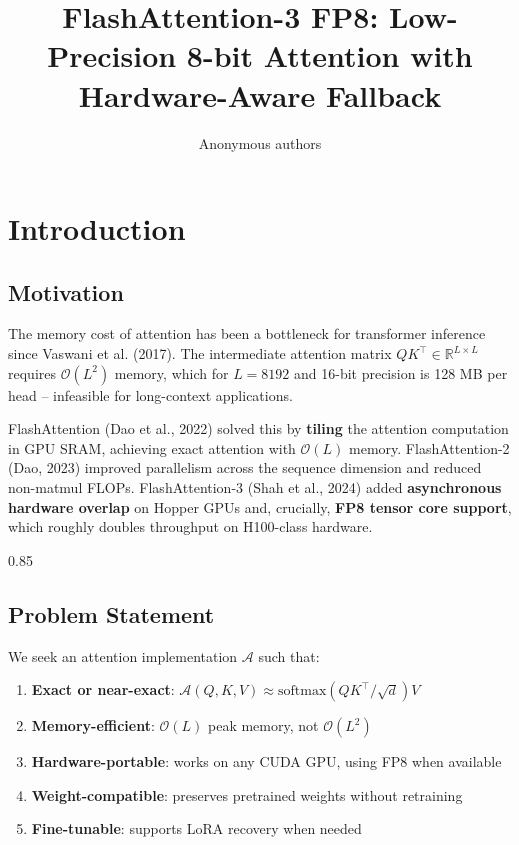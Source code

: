 \title{\textbf{FlashAttention-3 FP8: Low-Precision 8-bit Attention with Hardware-Aware Fallback}}

\author{Anonymous authors}



\section{Introduction}

\subsection{Motivation}

The memory cost of attention has been a bottleneck for transformer inference 
since Vaswani et al. (2017). The intermediate attention matrix $Q K^\top \in 
\mathbb{R}^{L \times L}$ requires $\mathcal{O}(L^2)$ memory, which for 
$L = 8192$ and 16-bit precision is 128 MB per head -- infeasible for 
long-context applications.

FlashAttention (Dao et al., 2022) solved this by \textbf{tiling} the attention 
computation in GPU SRAM, achieving exact attention with $\mathcal{O}(L)$ 
memory. FlashAttention-2 (Dao, 2023) improved parallelism across the sequence 
dimension and reduced non-matmul FLOPs. FlashAttention-3 (Shah et al., 2024) 
added \textbf{asynchronous hardware overlap} on Hopper GPUs and, crucially, 
\textbf{FP8 tensor core support}, which roughly doubles throughput on H100-class 
hardware.

0.85


\subsection{Problem Statement}

We seek an attention implementation $\mathcal{A}$ such that:

\begin{enumerate}
\item \textbf{Exact or near-exact}: $\mathcal{A}(Q, K, V) \approx \text{softmax}(QK^\top/\sqrt{d})V$
\item \textbf{Memory-efficient}: $\mathcal{O}(L)$ peak memory, not $\mathcal{O}(L^2)$
\item \textbf{Hardware-portable}: works on any CUDA GPU, using FP8 when available
\item \textbf{Weight-compatible}: preserves pretrained weights without retraining
\item \textbf{Fine-tunable}: supports LoRA recovery when needed

\end{enumerate}
